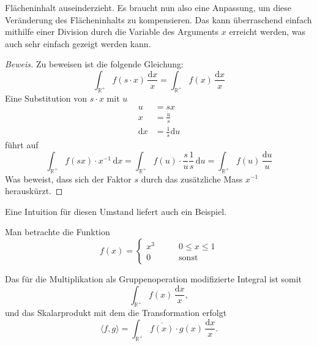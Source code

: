  Flächeninhalt auseinderzieht.
Es braucht nun also eine Anpassung, um diese Veränderung des Flächeninhalts 
zu kompensieren.
Das kann überraschend einfach mithilfe einer Division durch die Variable 
des Arguments $x$ erreicht werden, was auch sehr einfach gezeigt werden 
kann.
\begin{proof}[Beweis]
    Zu beweisen ist die folgende Gleichung:
    \[
        \int_\mathbb{R^+} f(s \cdot x)\,\frac{\mathrm{d}x}{x} 
        = \int_\mathbb{R^+} f(x)\,\frac{\mathrm{d}x}{x}
    \]
    Eine Substitution von $s \cdot x$ mit $u$
    \[
    \begin{aligned}
        u &= sx \\
        x &= \frac{u}{s} \\
        \mathrm{d}x &= \frac{1}{s} \mathrm{d}u
    \end{aligned}
    \]
    führt auf
    \[
        \int_\mathbb{R^+} f(sx) \cdot x^{-1}\,\mathrm{d}x 
        = \int_\mathbb{R^+} f(u) \cdot \frac{s}{u} \frac{1}{s}\,\mathrm{d}u
        = \int_\mathbb{R^+} f(u)\,\frac{\mathrm{d}u}{u}
    \]
    Was beweist, dass sich der Faktor $s$ durch das zusätzliche Mass 
    $x^{-1}$ herauskürzt. 
\end{proof}
Eine Intuition für diesen Umstand liefert auch ein Beispiel.
\begin{beispiel}
Man betrachte die Funktion 
\[
f(x) 
= 
\begin{cases}
    x^3 &\qquad 0\leq x\leq 1\\
    0 &\qquad \text{sonst}
\end{cases}
\]
\end{beispiel}
Das für die Multiplikation als Gruppenoperation modifizierte Integral ist 
somit
\begin{equation}
    \int_\mathbb{R^+} f(x)\,\frac{\mathrm{d}x}{x},
\end{equation}
und das Skalarprodukt mit dem die Transformation erfolgt
\begin{equation}
    \langle f,g \rangle 
    = \int_\mathbb{R^+} \overline{f(x)} \cdot g(x) \,\frac{\mathrm{d}x}{x}.
\end{equation}


